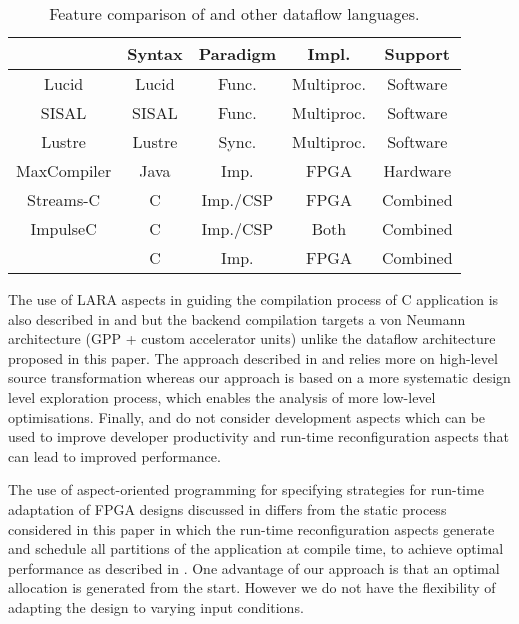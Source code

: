 \begin{table}[!h]
  \renewcommand{\arraystretch}{1.2}
  \centering
  \caption{Feature comparison of \MAXC{} and other dataflow languages.}
  \label{table:feature-comparison}
  \begin{tabular}{ c |  c |  c |  c |  c }
    \hline
    \           & \bf{Syntax} & \bf{Paradigm} & \bf{Impl.} & \bf{Support} \\
    \hline \hline
    Lucid       & Lucid       & Func.         & Multiproc. & Software     \\
    SISAL       & SISAL       & Func.         & Multiproc. & Software     \\
    Lustre      & Lustre      & Sync.         & Multiproc. & Software     \\
    MaxCompiler & Java        & Imp.          & FPGA       & Hardware     \\
    Streams-C   & C           & Imp./CSP      & FPGA       & Combined     \\
    ImpulseC    & C           & Imp./CSP      & Both       & Combined     \\
    \MAXC{}     & C           & Imp.          & FPGA       & Combined     \\
  \end{tabular}
\end{table}

The use of LARA aspects in guiding the compilation process of C
application is also described in
\cite{Cardoso:Teixeira:Alves:Nobre:Diniz:Cutinho:Luk:2012} and
\cite{cardoso2011new} but the backend compilation targets a von
Neumann architecture (GPP + custom accelerator units) unlike the
dataflow architecture proposed in this paper. The approach described
in \cite{Cardoso:Teixeira:Alves:Nobre:Diniz:Cutinho:Luk:2012} and
\cite{cardoso2011new} relies more on high-level source transformation
whereas our approach is based on a more systematic design level
exploration process, which enables the analysis of more low-level
optimisations. Finally,
\cite{Cardoso:Teixeira:Alves:Nobre:Diniz:Cutinho:Luk:2012} and
\cite{cardoso2011new} do not consider development aspects which can be
used to improve developer productivity and run-time reconfiguration
aspects that can lead to improved performance.

The use of aspect-oriented programming for specifying strategies for
run-time adaptation of FPGA designs discussed in \cite{6322875}
differs from the static process considered in this paper in which the
run-time reconfiguration aspects generate and schedule all partitions
of the application at compile time, to achieve optimal performance as
described in \cite{Xinyu:Qiwei:Luk:Qiang:Pell:2012}. One advantage of
our approach is that an optimal allocation is generated from the
start. However we do not have the flexibility of adapting the design
to varying input conditions.
